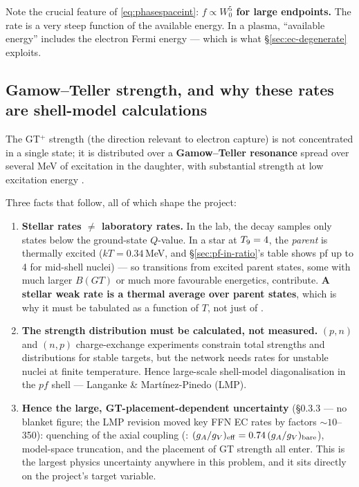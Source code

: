 Note the crucial feature of \eqref{eq:phasespaceint}: \textbf{$f \propto W_0^5$
for large endpoints.} The rate is a very steep function of the available energy.
In a plasma, ``available energy'' includes the electron Fermi energy --- which
is what \S\ref{sec:ec-degenerate} exploits.

\subsection{Gamow--Teller strength, and why these rates are shell-model calculations}
\label{sec:gt}

The GT$^+$ strength (the direction relevant to electron capture) is not
concentrated in a single state; it is distributed over a \textbf{Gamow--Teller
resonance} spread over several MeV of excitation in the daughter, with
substantial strength at low excitation energy \citep{langanke2000,langanke2003}.

Three facts that follow, all of which shape the project:

\begin{enumerate}
\item \textbf{Stellar rates $\ne$ laboratory rates.} In the lab, the decay
      samples only states below the ground-state $Q$-value. In a star at
      $T_{9} = 4$, the \emph{parent} is thermally excited ($kT = 0.34$\,MeV, and
      \S\ref{sec:pf-in-ratio}'s table shows pf up to 4 for mid-shell nuclei) ---
      so transitions from excited parent states, some with much larger $B(GT)$
      or much more favourable energetics, contribute. \textbf{A stellar weak
      rate is a thermal average over parent states}, which is why it must be
      tabulated as a function of $T$, not just of \rhoye.
\item \textbf{The strength distribution must be calculated, not measured.}
      $(p,n)$ and $(n,p)$ charge-exchange experiments constrain total strengths
      and distributions for stable targets, but the network needs rates for
      unstable nuclei at finite temperature. Hence large-scale shell-model
      diagonalisation in the $pf$ shell --- Langanke \&
      Mart\'inez-Pinedo (LMP).
\item \textbf{Hence the large, GT-placement-dependent uncertainty}
      (\S0.3.3 --- no blanket figure; the LMP revision moved key FFN EC rates by
      factors ${\sim}10$--350): quenching of the axial coupling
      (\citealp{langanke2000}: $(g_A/g_V)_{\rm eff} = 0.74\,(g_A/g_V)_{\rm
      bare}$), model-space truncation, and the placement of GT strength all
      enter. This is the largest physics uncertainty anywhere in this problem,
      and it sits directly on the project's target variable.
\end{enumerate}

